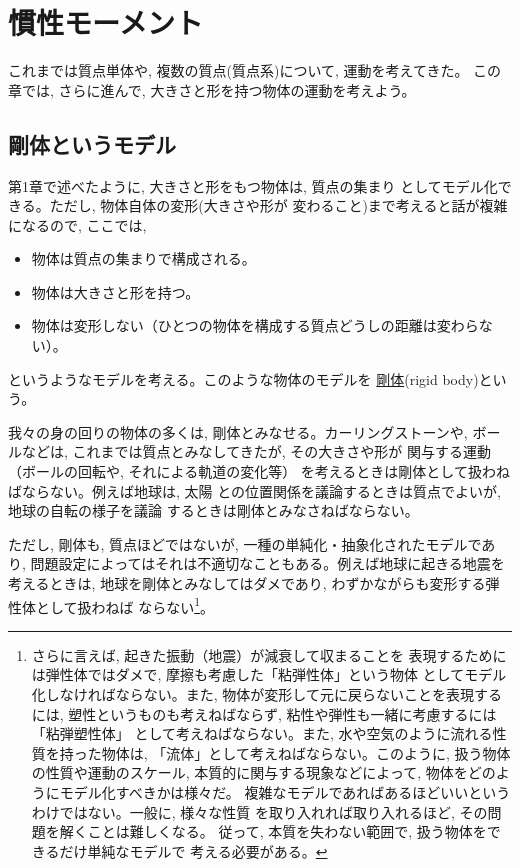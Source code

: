 \chapter{慣性モーメント}

これまでは質点単体や, 複数の質点(質点系)について, 運動を考えてきた。
この章では, さらに進んで, 大きさと形を持つ物体の運動を考えよう。

\section{剛体というモデル}

第1章で述べたように, 大きさと形をもつ物体は, 質点の集まり
としてモデル化できる。ただし, 物体自体の変形(大きさや形が
変わること)まで考えると話が複雑になるので, ここでは, 
\begin{itemize}
\item 物体は質点の集まりで構成される。
\item 物体は大きさと形を持つ。
\item 物体は変形しない（ひとつの物体を構成する質点どうしの距離は変わらない）。
\end{itemize}
というようなモデルを考える。このような物体のモデルを
\underline{剛体}(rigid body)という。

我々の身の回りの物体の多くは, 剛体とみなせる。カーリングストーンや, 
ボールなどは, これまでは質点とみなしてきたが, その大きさや形が
関与する運動（ボールの回転や, それによる軌道の変化等）
を考えるときは剛体として扱わねばならない。例えば地球は, 太陽
との位置関係を議論するときは質点でよいが, 地球の自転の様子を議論
するときは剛体とみなさねばならない。

ただし, 剛体も, 質点ほどではないが, 一種の単純化・抽象化されたモデルであり, 
問題設定によってはそれは不適切なこともある。例えば地球に起きる地震を考えるときは, 
地球を剛体とみなしてはダメであり, わずかながらも変形する弾性体として扱わねば
ならない\footnote{さらに言えば, 起きた振動（地震）が減衰して収まることを
表現するためには弾性体ではダメで, 摩擦も考慮した「粘弾性体」という物体
としてモデル化しなければならない。また, 物体が変形して元に戻らないことを表現するには, 
塑性というものも考えねばならず, 粘性や弾性も一緒に考慮するには「粘弾塑性体」
として考えねばならない。また, 水や空気のように流れる性質を持った物体は, 
「流体」として考えねばならない。このように, 扱う物体の性質や運動のスケール, 
本質的に関与する現象などによって, 物体をどのようにモデル化すべきかは様々だ。
複雑なモデルであればあるほどいいというわけではない。一般に, 様々な性質
を取り入れれば取り入れるほど, その問題を解くことは難しくなる。
従って, 本質を失わない範囲で, 扱う物体をできるだけ単純なモデルで
考える必要がある。}。\mv

